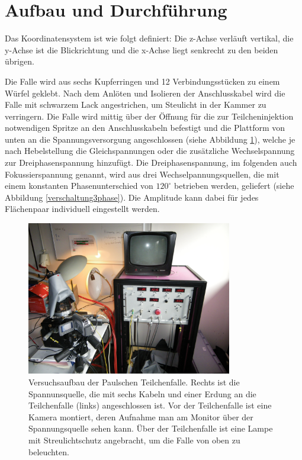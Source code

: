 \documentclass[a4paper,12pt]{article}
\begin{document}
\section{Aufbau und Durchführung}
Das Koordinatensystem ist wie folgt definiert:
Die z-Achse verläuft vertikal, die y-Achse ist die Blickrichtung und die x-Achse liegt senkrecht zu den beiden übrigen.

Die Falle wird aus sechs Kupferringen und 12 Verbindungsstücken zu einem Würfel geklebt.
Nach dem Anlöten und Isolieren der Anschlusskabel wird die Falle mit schwarzem Lack angestrichen, um Steulicht in der Kammer zu verringern.
Die Falle wird mittig über der Öffnung für die zur Teilcheninjektion notwendigen Spritze an den Anschlusskabeln befestigt 
und die Plattform von unten an die Spannungsversorgung angeschlossen (siehe Abbildung \ref{fallenbild}),
welche je nach Hebelstellung die Gleichspannungen oder die zusätzliche Wechselspannung zur Dreiphasenspannung hinzufügt.
Die Dreiphasenspannung, im folgenden auch Fokussierspannung genannt, wird aus drei Wechselpannungsquellen, die mit einem konstanten Phasenunterschied von $120^\circ$ betrieben werden, geliefert (siehe Abbildung \ref{verschaltung3phase}).
Die Amplitude kann dabei für jedes Flächenpaar individuell eingestellt werden.

\begin{figure}[htb]
		\centering
		\includegraphics[width=0.8\textwidth]{aufbau.jpg}
		\caption{Versuchsaufbau der Paulschen Teilchenfalle.
			Rechts ist die Spannunsquelle, die mit sechs Kabeln und einer Erdung an die Teilchenfalle (links) angeschlossen ist.
			Vor der Teilchenfalle ist eine Kamera montiert, deren Aufnahme man am Monitor über der Spannungsquelle sehen kann.
			Über der Teilchenfalle ist eine Lampe mit Streulichtschutz angebracht, um die Falle von oben zu beleuchten.
		}
		\label{fallenbild}
\end{figure}
\end{document}
